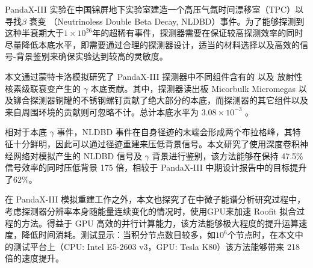
\begin{cabstract}
	\pkuthssffaq %
	PandaX-III 实验在中国锦屏地下实验室建造一个高压气氙时间漂移室（TPC）以寻找 $\beta$ 衰变 （Neutrinoless Double Beta Decay, NLDBD）事件。为了能够探测到这种半衰期大于$1\times10^{26}$年的超稀有事件，探测器需要在保证较高探测效率的同时尽量降低本底水平，即需要通过合理的探测器设计，适当的材料选择以及高效的信号-背景鉴别来确保实验达到较高的灵敏度。

	本文通过蒙特卡洛模拟研究了 PandaX-III 探测器中不同组件含有的 \utte 以及 \thttt 放射性核素级联衰变产生的 $\gamma$ 本底贡献。其中，探测器读出板 Micorbulk Micromegas 以及铆合探测器铜罐的不锈钢螺钉贡献了绝大部分的本底，而探测器的其它组件以及来自周围环境的贡献则可忽略不计。总计本底水平为 $3.08\times 10^{-3}$ \ckky。

	相对于本底 $\gamma$ 事件，NLDBD 事件在自身径迹的末端会形成两个布拉格峰，其特征十分鲜明，因此可以通过径迹重建来压低背景信号。本文研究了使用深度卷积神经网络对模拟产生的 NLDBD 信号及 $\gamma$ 背景进行鉴别，该方法能够在保持 47.5\% 信号效率的同时压低背景 175 倍，相较于 PandaX-III 中期设计报告中的目标提升了62\%。

	在 PandaX-III 模拟重建工作之外，本文也探究了在中微子能谱分析研究过程中，考虑探测器分辨率本身随能量连续变化的情况时，使用GPU来加速 Roofit 拟合过程的方法。得益于 GPU 高效的并行计算能力，该方法能够极大程度的提升运算速度，降低时间消耗。测试显示：当积分节点数目较多，如$10^6$个节点时，在本文中的测试平台上（CPU: Intel E5-2603 v3，GPU: Tesla K80）该方法能够带来 218 倍的速度提升。

\end{cabstract}

